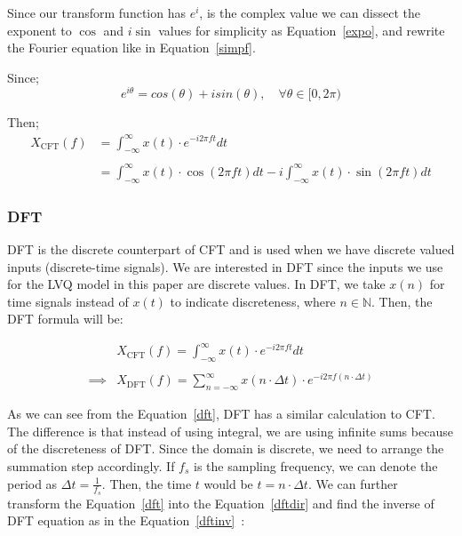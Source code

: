 Since our transform function has $e^{i}$, is the complex value we can dissect the exponent to $\cos$ and $i\sin$ values for simplicity as Equation~\eqref{expo}, and rewrite the Fourier equation like in Equation~\eqref{simpf}.
\vspace{10pt}

Since;
\begin{equation}
  e^{i\theta} = cos(\theta) + isin(\theta), \quad\forall \theta \in [0,2\pi)
  \label{expo}
\end{equation}
\vspace{10pt}

Then;
\begin{equation}
\begin{split}
  X_{\text{CFT}} (f) &= \int_{-\infty}^{\infty} x(t)\cdot e^{-i2\pi ft}dt \\
  \\
 &=\int_{-\infty}^{\infty} x(t)\cdot \cos(2\pi ft)dt - i\int_{-\infty}^{\infty} x(t)\cdot \sin(2\pi ft)dt \label{simpf}
\end{split}
\end{equation}


\subsubsection{DFT}

DFT is the discrete counterpart of CFT and is used when we have discrete valued inputs (discrete-time signals). We are interested in DFT since the inputs we use for the LVQ model in this paper are discrete values. In DFT, we take $x(n)$ for time signals instead of $x(t)$ to indicate discreteness, where $n \in \mathbb{N}$. Then, the DFT formula will be:
\vspace{10pt}

\begin{equation}
\begin{split}
  &X_{\text{CFT}}(f) = \int_{-\infty}^{\infty} x(t)\cdot e^{-i2\pi ft}dt \\
  \\
  \implies& X_{\text{DFT}}(f) = \sum_{n = -\infty}^{\infty} x(n\cdot \Delta t)\cdot e^{-i2\pi f(n\cdot \Delta t)}\label{dft}
\end{split}
\end{equation}
\vspace{10pt}

As we can see from the Equation~\eqref{dft}, DFT has a similar calculation to CFT. The difference is that instead of using integral, we are using infinite sums because of the discreteness of DFT. Since the domain is discrete, we need to arrange the summation step accordingly. If $f_{s}$ is the sampling frequency, we can denote the period as $\Delta t = \frac{1}{f_{s}}$. Then, the time $t$ would be $ t = n \cdot \Delta t $. We can further transform the Equation~\eqref{dft} into the Equation~\eqref{dftdir} and find the inverse of DFT equation as in the Equation~\eqref{dftinv}~\cite{four}:
\vspace{10pt}

